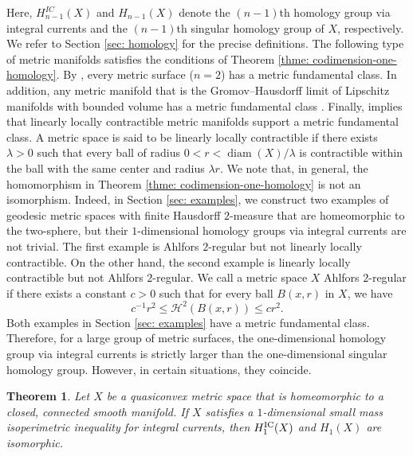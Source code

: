 \documentclass{amsart}
\newtheorem{theorem}{Theorem}[section]
\numberwithin{equation}{section}
\newcommand{\Ha}{\mathcal{H}}
\newcommand{\diam}{\operatorname{diam}}
\begin{document}
    Here, $H_{n-1}^{IC}(X)$ and $H_{n-1}(X)$ denote the \((n-1)\)th homology group via integral currents and the \((n-1)\)th singular homology group of $X$, respectively. We refer to Section \ref{sec: homology} for the precise definitions. The following type of metric manifolds satisfies the conditions of Theorem \ref{thme: codimension-one-homology}. By \cite[Theorem 1.3]{basso2023geometric}, every metric surface ($n=2$) has a metric fundamental class. In addition, any metric manifold that is the Gromov–Hausdorff limit of Lipschitz manifolds with bounded volume has a metric fundamental class \cite[Theorem 1.2]{marti2024characterization}. Finally, \cite[Theorem 1.1]{basso2023geometric} implies that linearly locally contractible metric manifolds support a metric fundamental class. 
    A metric space is said to be linearly locally contractible if there exists $\lambda>0$ such that every ball of radius  $0<r<\diam( X)/ \lambda$ is contractible within the ball with the same center and radius $\lambda r$. We note that, in general, the homomorphism in Theorem \ref{thme: codimension-one-homology} is not an isomorphism. Indeed, in Section \ref{sec: examples}, we construct two examples of geodesic metric spaces with finite Hausdorff $2$-measure that are homeomorphic to the two-sphere, but their $1$-dimensional homology groups via integral currents are not trivial. The first example is Ahlfors $2$-regular but not linearly locally contractible. On the other hand, the second example is linearly locally contractible but not Ahlfors $2$-regular. We call a metric space $X$ Ahlfors $2$-regular if there exists a constant $c>0$ such that for every ball $B(x,r)$ in $X$, we have
    $$c^{-1}r^2 \leq \Ha^2(B(x,r))\leq cr^2.$$ 
    Both examples in Section \ref{sec: examples} have a metric fundamental class. Therefore, for a large group of metric surfaces, the one-dimensional homology group via integral currents is strictly larger than the one-dimensional singular homology group. However, in certain situations, they coincide.

    \begin{theorem}\label{thme: one-homology}
        Let $X$ be a quasiconvex metric space that is homeomorphic to a closed, connected smooth manifold. If $X$ satisfies a $1$-dimensional small mass isoperimetric inequality for integral currents, then $H_1^\textup{IC}(X)$ and $H_1(X)$ are isomorphic.
    \end{theorem}
\end{document}
